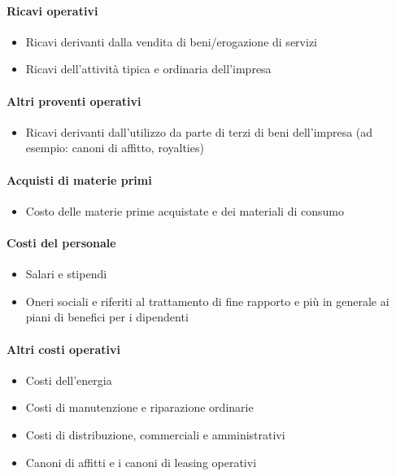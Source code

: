 \documentclass[10pt,a4paper,fleqn,oneside]{book}
\begin{document}
\paragraph{Ricavi operativi}
\begin{itemize}
    \item Ricavi derivanti dalla vendita di beni/erogazione di servizi
    \item Ricavi dell’attività tipica e ordinaria dell’impresa
\end{itemize}

\paragraph{Altri proventi operativi}
\begin{itemize}
    \item Ricavi derivanti dall’utilizzo da parte di terzi di beni dell’impresa (ad
    esempio: canoni di affitto, royalties)
\end{itemize}

\paragraph{Acquisti di materie primi}
\begin{itemize}
    \item Costo delle materie prime acquistate e dei materiali
    di consumo
\end{itemize}

\paragraph{Costi del personale}
\begin{itemize}
    \item Salari e stipendi
    \item Oneri sociali e riferiti al trattamento di
    fine rapporto e più in generale ai piani di benefici per i dipendenti
\end{itemize}

\paragraph{Altri costi operativi}
\begin{itemize}
    \item Costi dell’energia
    \item Costi di manutenzione e riparazione ordinarie
    \item Costi di distribuzione, commerciali e amministrativi
    \item Canoni di affitti e i canoni di leasing operativi
\end{itemize}
\end{document}

